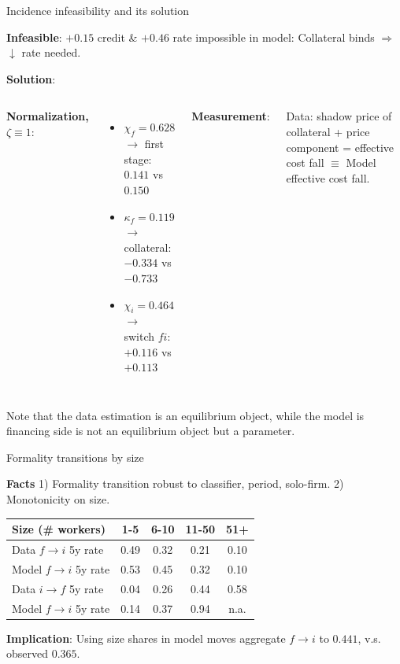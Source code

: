 \documentclass[11pt,aspectratio=169]{beamer}
\providecommand{\infml}{i}
\providecommand{\fml}{f}
\begin{document}

\begin{frame}{Incidence infeasibility and its solution}

\textbf{Infeasible}: $+0.15$ credit \& $+0.46$ rate impossible in model: Collateral binds $\Rightarrow$ $\downarrow$ rate needed. 

\bigskip
\textbf{Solution}:
\bigskip
\begin{columns}[T]
\textbf{Normalization, $\zeta \equiv 1$}:
\begin{itemize}
  \item $\chi_{\fml} = 0.628$ $\to$ first stage: $0.141$ vs
    $0.150$
  \item $\kappa_{\fml} = 0.119$ $\to$ collateral: $-0.334$ vs
    $-0.733$
  \item $\chi_{\infml} = 0.464$ $\to$ switch $\fml\infml$:
    $+0.116$ vs $+0.113$
\end{itemize}
\textbf{Measurement}:

Data: shadow price of collateral + price component = effective cost fall $\equiv$ Model effective cost fall.
\end{columns}

\vspace{5mm}
Note that the data estimation is an equilibrium object, while the model is financing side is not an equilibrium object but a parameter.

\end{frame}
 

\begin{frame}{Formality transitions by size}

\textbf{Facts} 1) Formality transition robust to classifier, period, solo-firm. 2) Monotonicity on size.

\begin{center}
    \renewcommand{\arraystretch}{1.15}
    \begin{tabular}{lcccc}
        \toprule
        Size (\# workers) & 1-5 & 6-10 & 11-50 & 51+ \\
        \midrule
        Data $\fml{\to}\infml$ 5y rate & 0.49 & 0.32 & 0.21 & 0.10 \\
        Model $\fml{\to}\infml$ 5y rate & 0.53 & 0.45 & 0.32 & 0.10 \\
        Data $\infml{\to}\fml$ 5y rate & 0.04 & 0.26 & 0.44 & 0.58 \\
        Model $\fml{\to}\infml$ 5y rate & 0.14 & 0.37 & 0.94 & n.a. \\
        \bottomrule
    \end{tabular}
\end{center}

\medskip

\textbf{Implication}: Using size shares in model moves aggregate $\fml{\to}\infml$ to $0.441$, v.s. observed $0.365$.
\end{frame}
 
\end{document}
